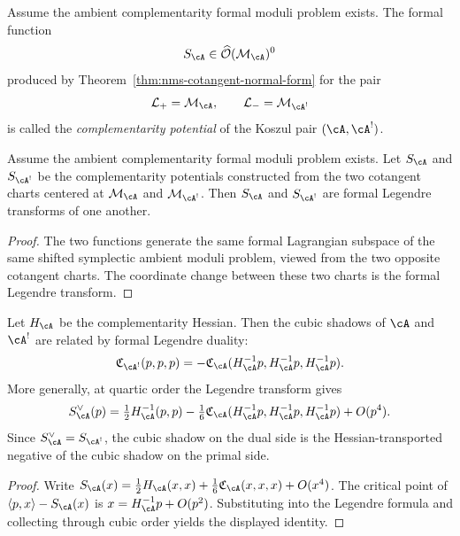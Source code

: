 \begin{definition}
\label{def:nms-complementarity-potential}
Assume the ambient complementarity formal moduli problem exists. The formal function
\[
S_{\cA}\in \widehat{\mathcal O}(\mathcal M_{\cA})^0
\]
produced by Theorem~\ref{thm:nms-cotangent-normal-form} for the pair
\[
\mathcal L_+=\mathcal M_{\cA},
\qquad
\mathcal L_- = \mathcal M_{\cA^!}
\]
is called the \emph{complementarity potential} of the Koszul pair $(\cA,\cA^!)$.
\end{definition}

\begin{proposition}
\label{prop:nms-legendre-duality}
Assume the ambient complementarity formal moduli problem exists. Let $S_{\cA}$ and $S_{\cA^!}$ be the complementarity potentials constructed from the two cotangent charts centered at $\mathcal M_{\cA}$ and $\mathcal M_{\cA^!}$. Then $S_{\cA}$ and $S_{\cA^!}$ are formal Legendre transforms of one another.
\end{proposition}

\begin{proof}
The two functions generate the same formal Lagrangian subspace of the same shifted symplectic ambient moduli problem, viewed from the two opposite cotangent charts. The coordinate change between these two charts is the formal Legendre transform.\qedhere
\end{proof}

\begin{proposition}
\label{prop:nms-legendre-cubic}
Let $H_{\cA}$ be the complementarity Hessian. Then the cubic shadows of $\cA$ and $\cA^!$ are related by formal Legendre duality:
\[
\mathfrak C_{\cA^!}(p,p,p)
= -\mathfrak C_{\cA}(H_{\cA}^{-1}p, H_{\cA}^{-1}p, H_{\cA}^{-1}p).
\]
More generally, at quartic order the Legendre transform gives
\[
S_{\cA}^\vee(p)
= \tfrac12 H_{\cA}^{-1}(p,p)
- \tfrac{1}{6}\mathfrak C_{\cA}(H_{\cA}^{-1}p,H_{\cA}^{-1}p,H_{\cA}^{-1}p)
+ O(p^4).
\]
Since $S_{\cA}^\vee = S_{\cA^!}$, the cubic shadow on the dual side is the Hessian-transported negative of the cubic shadow on the primal side.
\end{proposition}

\begin{proof}
Write $S_{\cA}(x) = \frac12 H_{\cA}(x,x) + \frac16 \mathfrak C_{\cA}(x,x,x) + O(x^4)$. The critical point of $\langle p,x\rangle - S_{\cA}(x)$ is $x = H_{\cA}^{-1}p + O(p^2)$. Substituting into the Legendre formula and collecting through cubic order yields the displayed identity.\qedhere
\end{proof}

